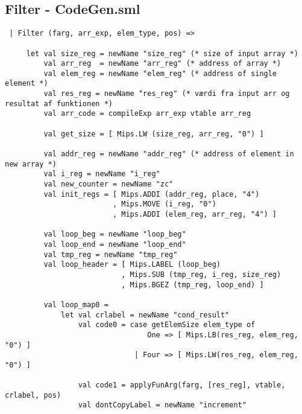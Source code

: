 \documentclass{article}
\begin{document}
\subsection{Filter - CodeGen.sml}\label{app:scan}
\begin{verbatim}
 | Filter (farg, arr_exp, elem_type, pos) =>      
      
     let val size_reg = newName "size_reg" (* size of input array *)
         val arr_reg  = newName "arr_reg" (* address of array *)
         val elem_reg = newName "elem_reg" (* address of single element *)
         val res_reg = newName "res_reg" (* værdi fra input arr og resultat af funktionen *) 
         val arr_code = compileExp arr_exp vtable arr_reg

         val get_size = [ Mips.LW (size_reg, arr_reg, "0") ]

         val addr_reg = newName "addr_reg" (* address of element in new array *)
         val i_reg = newName "i_reg"
         val new_counter = newName "zc"
         val init_regs = [ Mips.ADDI (addr_reg, place, "4")
                         , Mips.MOVE (i_reg, "0")
                         , Mips.ADDI (elem_reg, arr_reg, "4") ]

         val loop_beg = newName "loop_beg"
         val loop_end = newName "loop_end"
         val tmp_reg = newName "tmp_reg"
         val loop_header = [ Mips.LABEL (loop_beg)
                           , Mips.SUB (tmp_reg, i_reg, size_reg)
                           , Mips.BGEZ (tmp_reg, loop_end) ]             
                           
         val loop_map0 =
             let val crlabel = newName "cond_result"
                 val code0 = case getElemSize elem_type of
                                 One => [ Mips.LB(res_reg, elem_reg, "0") ]
                              | Four => [ Mips.LW(res_reg, elem_reg, "0") ]

                 val code1 = applyFunArg(farg, [res_reg], vtable, crlabel, pos)
                 val dontCopyLabel = newName "increment"
                 

\end{verbatim}
\end{document}
